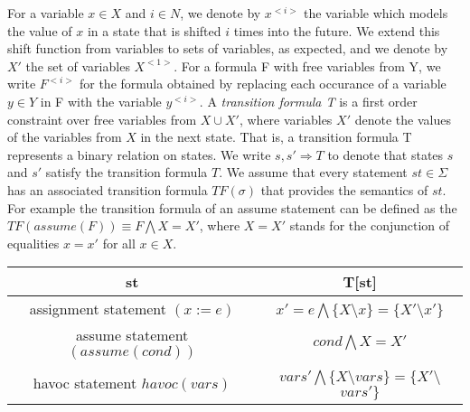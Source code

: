 \documentclass{article}
\begin{document}
For a variable $x \in X$ and $i \in N$, we denote by $x^{<i>}$ the variable which models the value of $x$ in a state that is shifted $i$ times into the future. We extend this shift function from variables to sets of variables, as expected, and we denote by $X'$ the set of variables $X^{<1>}$. For a formula F with free variables from Y, we write $F^{<i>}$ for the formula obtained by replacing each occurance of a variable $y \in Y$ in F with the variable $y^{<i>}$. A \textit{transition formula T}  is a first order constraint over free variables from $X \cup X'$, where variables $X'$ denote the values of the variables from $X$ in the next state. That is, a transition formula T represents a binary relation on states. We write $s,s' \Rightarrow T$ to denote that states $s$ and $s'$ satisfy the transition formula $T$. We assume that every statement $st \in \Sigma$ has an associated transition formula $TF(\sigma)$ that provides the semantics of $st$. For example the transition formula of an assume statement can be defined as the $TF(assume(F)) \equiv F \bigwedge X = X'$, where $X = X'$ stands for the conjunction of equalities $x=x'$ for all $x \in X$.\\

\begin{center}
\begin{tabular}{|c|c|}
\hline
st & T[st] \\
\hline
assignment statement $(x := e)$ & $x'=e \bigwedge \lbrace X$\textbackslash$x \rbrace = \lbrace X'$\textbackslash $x' \rbrace$ \\
assume statement $(assume(cond))$ & $cond \bigwedge X=X'$  \\
havoc statement $havoc(vars)$ & $vars'\bigwedge \lbrace X$\textbackslash$vars \rbrace = \lbrace X'$\textbackslash$vars' \rbrace$\\
\hline
\end{tabular}
\end{center}
\end{document}
